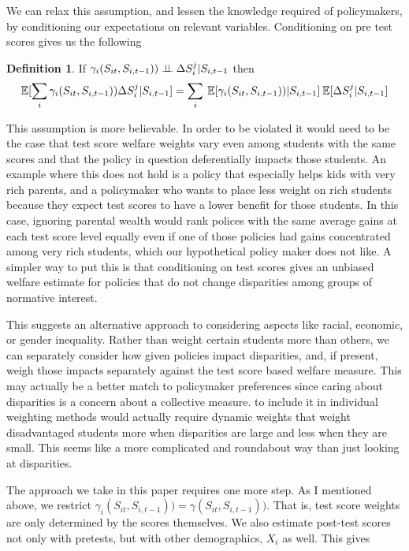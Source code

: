 \documentclass[12pt]{article}
\theoremstyle{definition}
\theoremstyle{definition}
\theoremstyle{definition}
\theoremstyle{definition}
\newtheorem{definition}{Definition}
\begin{document}
    We can relax this assumption, and lessen the knowledge required of policymakers, by conditioning our expectations on relevant variables. Conditioning on pre test scores gives us the following 
    
    \large
    \begin{definition}
    \label{cond_exp_1}
        If $ \gamma_i(S_{it}, S_{i,t-1})) \perp \!\!\! \perp \Delta S_i^j | S_{i,t-1}$ then
        \begin{equation*}
           \mathbb{E}[\sum_i \gamma_i(S_{it}, S_{i,t-1})) \Delta S_i^j| S_{i,t-1}]= \sum_i \: \mathbb{E}[\gamma_i(S_{it}, S_{i,t-1}))|S_{i,t-1}] \:\mathbb{E}[\Delta S_i^j|S_{i,t-1}] 
        \end{equation*}
    \end{definition}
    \normalsize
    
    This assumption is more believable. In order to be violated it would need to be the case that test score welfare weights vary even among students with the same scores and that the policy in question deferentially impacts those students. An example where this does not hold is a policy that especially helps kids with very rich parents, and a policymaker who wants to place less weight on rich students because they expect test scores to have a lower benefit for those students. In this case, ignoring parental wealth would rank polices with the same average gains at each test score level equally even if one of those policies had gains concentrated among very rich students, which our hypothetical policy maker does not like. A simpler way to put this is that conditioning on test scores gives an unbiased welfare estimate for policies that do not change disparities among groups of normative interest. 
    
    This suggests an alternative approach to considering aspects like racial, economic, or gender inequality. Rather than weight certain students more than others, we can separately consider how given policies impact disparities, and, if present, weigh those impacts separately against the test score based welfare measure. This may actually be a better match to policymaker preferences since caring about disparities is a concern about a collective measure. to include it in individual weighting methods would actually require dynamic weights that weight disadvantaged students more when disparities are large and less when they are small. This seems like a more complicated and roundabout way than just looking at disparities.
    
    The approach we take in this paper requires one more step. As I mentioned above, we restrict $\gamma_i(S_{it}, S_{i,t-1})) = \gamma(S_{it}, S_{i,t-1}))$. That is, test score weights are only determined by the scores themselves. We also estimate post-test scores not only with pretests, but with other demographics, $X_i$ as well. This gives 
    
\end{document}
